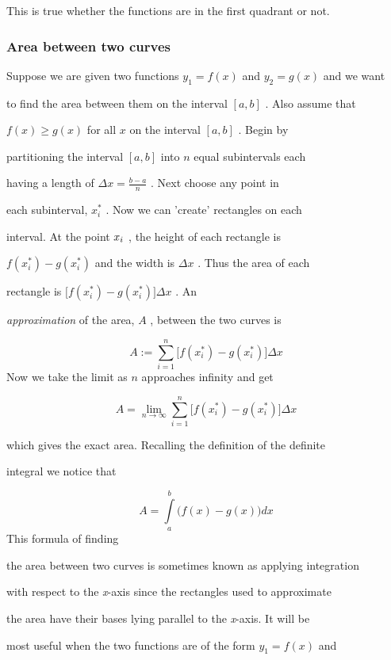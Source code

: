This is true whether the functions are in the first quadrant or not.


\subsubsection{Area between two curves}
\label{sss:area-769e}


Suppose we are given two functions $y_1=f(x)$ and $y_2=g(x)$ and we want

to find the area between them on the interval $[a,b]$ . Also assume that

$f(x)\ge g(x)$ for all $x$ on the interval $[a,b]$ . Begin by

partitioning the interval $[a,b]$ into $n$ equal subintervals each

having a length of $\Delta x=\frac{b-a}{n}$ . Next choose any point in

each subinterval, $x_i^{*}$ . Now we can 'create' rectangles on each

interval. At the point $x_i\*$ , the height of each rectangle is

$f(x_i^{*})-g(x_i^{*})$ and the width is $\Delta x$ . Thus the area of each

rectangle is $\bigl[f(x_i^{*})-g(x_i^{*})\bigr]\Delta x$ . An

\textit{approximation} of the area, $A$ , between the two curves is


\[
A:=\sum _{i=1}^n \Big[f(x_i^{*})-g(x_i^{*})\Big]\Delta x
\] Now we take the limit as $n$ approaches infinity and get


\[
A=\lim _{n\to\infty}\sum _{i=1}^n \Big[f(x_i^{*})-g(x_i^{*})\Big]\Delta x
\]

which gives the exact area. Recalling the definition of the definite

integral we notice that


\[
A=\int\limits_a^b \bigl(f(x)-g(x)\bigr)dx
\]  This formula of finding

the area between two curves is sometimes known as applying integration

with respect to the \textit{x}-axis since the rectangles used to approximate

the area have their bases lying parallel to the \textit{x}-axis. It will be

most useful when the two functions are of the form $y_1=f(x)$ and

